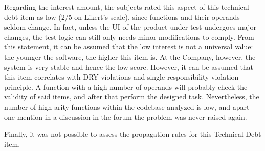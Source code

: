      \label{sec:disc-rq3-high-arity}
    Regarding the interest amount, the subjects rated this aspect of this technical debt item as low (2/5 on Likert's scale), since functions and their operands seldom change. In fact, unless the UI of the product under test undergoes major changes, the test logic can still only needs minor modifications to comply. From this statement, it can be assumed that the low interest is not a universal value: the younger the software, the higher this item is. At the Company, however, the system is very stable and hence the low score. However, it can be assumed that this item correlates with DRY violations and single responsibility violation principle. A function with a high number of operands will probably check the validity of said items, and after that perform the designed task. Nevertheless, the number of high arity functions within the codebase analyzed is low, and apart one mention in a discussion in the forum the problem was never raised again.
    
    Finally, it was not possible to assess the propagation rules for this Technical Debt item.




